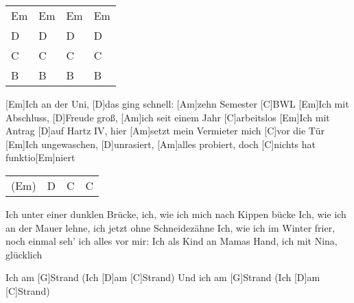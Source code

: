 \begin{guitar}
	{\footnotesize\begin{tabular}{|l|l|l|l|}
			Em & Em & Em & Em \\
			D & D & D & D \\
			C & C & C & C \\
			B & B & B & B
	\end{tabular}}
	
	[Em]Ich an der Uni, [D]das ging schnell: [Am]zehn Semester [C]BWL
	[Em]Ich mit Abschluss, [D]Freude groß, [Am]ich seit einem Jahr [C]arbeitslos
	[Em]Ich mit Antrag [D]auf Hartz IV, hier [Am]setzt mein Vermieter mich [C]vor die Tür
	[Em]Ich ungewaschen, [D]unrasiert, [Am]alles probiert, doch [C]nichts hat funktio[Em]niert
	
	{\footnotesize\begin{tabular}{|l|l|l|l|}
			(Em) & D & C & C
	\end{tabular}}

	Ich unter einer dunklen Brücke, ich, wie ich mich nach Kippen bücke
	Ich, wie ich an der Mauer lehne, ich jetzt ohne Schneidezähne
	Ich, wie ich im Winter frier, noch einmal seh' ich alles vor mir:
	Ich als Kind an Mamas Hand, ich mit Nina, glücklich
	
	\begin{highlightbar}
		 
		Ich am [G]Strand (Ich [D]am [C]Strand)
		Und ich am [G]Strand (Ich [D]am [C]Strand)
	\end{highlightbar}
\end{guitar}